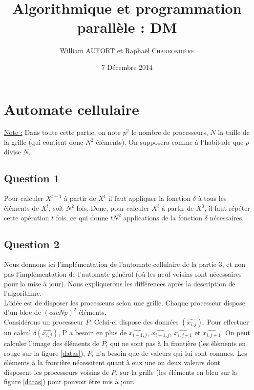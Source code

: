\documentclass{article}
\title{Algorithmique et programmation parallèle : DM}
\author{William \textsc{AUFORT} et Raphaël \textsc{Charrondière}}
\date{7 Décembre 2014}
\begin{document}
\maketitle

\section{Automate cellulaire}

\underline{Note :} Dans toute cette partie, on note $p^2$ le nombre de processeurs, $N$ la taille de la grille (qui contient donc $N^2$ éléments).
On supposera comme à l'habitude que $p$ divise $N$.

\subsection*{Question 1}

Pour calculer $X^{t+1}$ à partir de $X^t$ il faut appliquer la fonction $\delta$ à tous les éléments de $X^t$, soit $N^2$ fois.
Donc, pour calculer $X^t$ à partir de $X^0$, il faut répéter cette opération $t$ fois, ce qui donne $t N^2$ applications de la fonction $\delta$ nécessaires.

\subsection*{Question 2}

Nous donnons ici l'implémentation de l'automate cellulaire de la partie 3, et non pas l'implémentation de l'automate général (où les neuf voisins sont nécessaires pour la mise à jour). Nous expliquerons les différences après la description de l'algorithme. \\

L'idée est de disposer les processeurs selon une grille. Chaque processeur dispose d'un bloc de $\left( cac{N}{p} \right) ^2$ éléments.\\

Considérons un processeur $P$. Celui-ci dispose des données $(\widehat{x_{i,j}})$.
Pour effectuer un calcul $\delta(\widehat{x_{i,j}})$, P a besoin en plus de $\widehat{x_{i-1,j}}$, $\widehat{x_{i+1,j}}$, $\widehat{x_{i,j-1}}$ et $\widehat{x_{i,j+1}}$.
On peut calculer l'image des éléments de $P_i$ qui ne sont pas à la frontière (les éléments en rouge sur la figure \ref{datas}), $P_i$ n'a besoin que de valeurs qui lui sont connues.
Les éléments à la frontière nécessitent quant à eux une ou deux valeurs dont disposent les processeurs voisins de $P_i$ sur la grille (les éléments en bleu sur la figure \ref{datas}) pour pouvoir être mis à jour.
\end{document}
